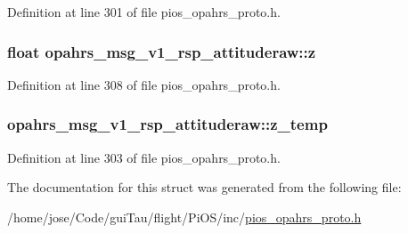 Definition at line 301 of file pios\-\_\-opahrs\-\_\-proto.\-h.

\hypertarget{structopahrs__msg__v1__rsp__attituderaw_a89e64d34f7b49ea15eacd2cddd52dd39}{
\subsubsection[{z}]{\setlength{\rightskip}{0pt plus 5cm}float opahrs\-\_\-msg\-\_\-v1\-\_\-rsp\-\_\-attituderaw\-::z}}\label{structopahrs__msg__v1__rsp__attituderaw_a89e64d34f7b49ea15eacd2cddd52dd39}


Definition at line 308 of file pios\-\_\-opahrs\-\_\-proto.\-h.

\hypertarget{structopahrs__msg__v1__rsp__attituderaw_a769a1a90325d8484a26456bb26342ffa}{
\subsubsection[{z\-\_\-temp}]{ opahrs\-\_\-msg\-\_\-v1\-\_\-rsp\-\_\-attituderaw\-::z\-\_\-temp}}\label{structopahrs__msg__v1__rsp__attituderaw_a769a1a90325d8484a26456bb26342ffa}


Definition at line 303 of file pios\-\_\-opahrs\-\_\-proto.\-h.



The documentation for this struct was generated from the following file\-:\begin{DoxyCompactItemize}
\item 
/home/jose/\-Code/gui\-Tau/flight/\-Pi\-O\-S/inc/\hyperlink{pios__opahrs__proto_8h}{pios\-\_\-opahrs\-\_\-proto.\-h}\end{DoxyCompactItemize}
